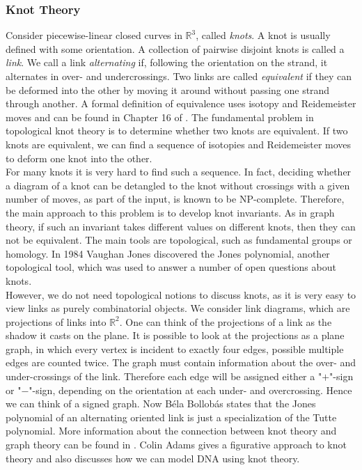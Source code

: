 \documentclass[12pt,a4paper, twoside, autooneside=false]{scrartcl}
\theoremstyle{definition}
\theoremstyle{remark}
\numberwithin{equation}{section}
\begin{document}
\subsubsection{Knot Theory}
Consider piecewise-linear closed curves in $\mathbb{R}^3$, called \textit{knots}. A knot is usually defined with some orientation. A collection of pairwise disjoint knots is called a \textit{link}. We call a link \textit{alternating} if, following the orientation on the strand, it alternates in over- and undercrossings. Two links are called \textit{equivalent} if they can be deformed into the other by moving it around without passing one strand through another. A formal definition of equivalence uses isotopy and Reidemeister moves and can be found in Chapter 16 of \cite{GoRo2001}. The fundamental problem in topological knot theory is to determine whether two knots are equivalent. If two knots are equivalent, we can find a sequence of isotopies and Reidemeister moves to deform one knot into the other. \\
\indent For many knots it is very hard to find such a sequence. In fact, deciding whether a diagram of a knot can be detangled to the knot without crossings with a given number of moves, as part of the input, is known to be NP-complete. Therefore, the main approach to this problem is to develop knot invariants. As in graph theory, if such an invariant takes different values on different knots, then they can not be equivalent. The main tools are topological, such as fundamental groups or homology. In 1984 Vaughan Jones \cite{Jo1985} discovered the Jones polynomial, another topological tool, which was used to answer a number of open questions about knots. \\
\indent However, we do not need topological notions to discuss knots, as it is very easy to view links as purely combinatorial objects. We consider link diagrams, which are projections of links into $\mathbb{R}^2$. One can think of the projections of a link as the shadow it casts on the plane. It is possible to look at the projections as a plane graph, in which every vertex is incident to exactly four edges, possible multiple edges are counted twice. The graph must contain information about the over- and under-crossings of the link. Therefore each edge will be assigned either a "$+$"-sign or "$-$"-sign, depending on the orientation at each under- and overcrossing. Hence we can think of a signed graph. Now Béla Bollobás \cite{Bol1998} states that the Jones polynomial of an alternating oriented link is just a specialization of the Tutte polynomial. More information about the connection between knot theory and graph theory can be found in \cite{GoRo2001}. Colin Adams \cite{Co1994} gives a figurative approach to knot theory and also discusses how we can model DNA using knot theory.
\end{document}
